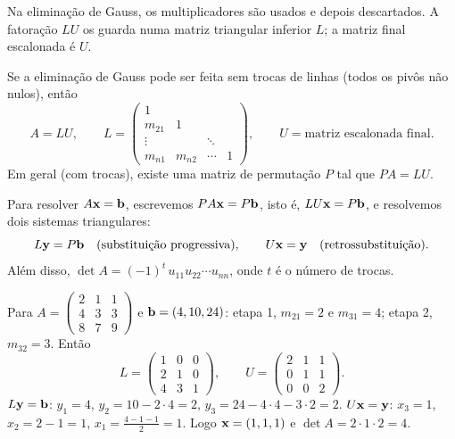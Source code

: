 Na eliminação de Gauss, os multiplicadores são usados e depois descartados. A fatoração $LU$
os guarda numa matriz triangular inferior $L$; a matriz final escalonada é $U$.

\begin{teorema}[Fatoração LU]
Se a eliminação de Gauss pode ser feita sem trocas de linhas (todos os pivôs não nulos), então
\[
A=LU,\qquad
L=\begin{pmatrix}
1 & & & \\
m_{21} & 1 & & \\
\vdots & & \ddots & \\
m_{n1} & m_{n2} & \cdots & 1
\end{pmatrix},
\qquad U=\text{matriz escalonada final}.
\]
Em geral (com trocas), existe uma matriz de permutação $P$ tal que $PA=LU$.
\end{teorema}

Para resolver $A\mathbf{x}=\mathbf{b}$, escrevemos $PA\mathbf{x}=P\mathbf{b}$, isto é, $LU\mathbf{x}=P\mathbf{b}$, e resolvemos dois
sistemas triangulares:
\[
L\mathbf{y}=P\mathbf{b}\quad\text{(substituição progressiva)},\qquad U\mathbf{x}=\mathbf{y}\quad\text{(retrossubstituição)}.
\]
Além disso, $\det A=(-1)^{t}\,u_{11}u_{22}\cdots u_{nn}$, onde $t$ é o número de trocas.

\begin{exemplo}[: fatoração sem trocas ($P=I$)]
Para $A=\begin{pmatrix}2&1&1\\4&3&3\\8&7&9\end{pmatrix}$ e $\mathbf{b}=(4,10,24)$:
etapa 1, $m_{21}=2$ e $m_{31}=4$; etapa 2, $m_{32}=3$. Então
\[
L=\begin{pmatrix}1&0&0\\2&1&0\\4&3&1\end{pmatrix},\qquad
U=\begin{pmatrix}2&1&1\\0&1&1\\0&0&2\end{pmatrix}.
\]
$L\mathbf{y}=\mathbf{b}$: $y_1=4$, $y_2=10-2\cdot4=2$, $y_3=24-4\cdot4-3\cdot2=2$.
$U\mathbf{x}=\mathbf{y}$: $x_3=1$, $x_2=2-1=1$, $x_1=\frac{4-1-1}{2}=1$. Logo $\mathbf{x}=(1,1,1)$ e
$\det A=2\cdot1\cdot2=4$.
\end{exemplo}

